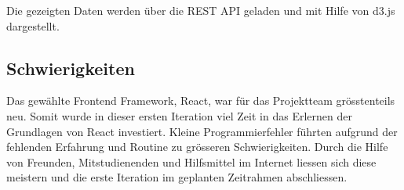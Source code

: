 Die gezeigten Daten werden über die \ac{REST} \ac{API} geladen und mit Hilfe von d3.js dargestellt.


\subsection{Schwierigkeiten}
Das gewählte Frontend Framework, React, war für das Projektteam grösstenteils neu.
Somit wurde in dieser ersten Iteration viel Zeit in das Erlernen der Grundlagen von React investiert.
Kleine Programmierfehler führten aufgrund der fehlenden Erfahrung und Routine zu grösseren Schwierigkeiten.
Durch die Hilfe von Freunden, Mitstudienenden und Hilfsmittel im Internet liessen sich diese meistern
und die erste Iteration im geplanten Zeitrahmen abschliessen.
